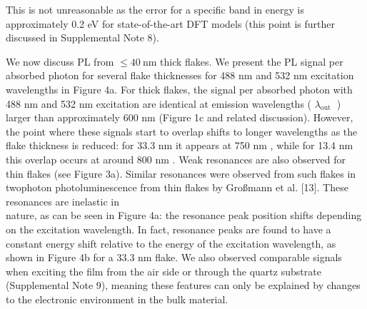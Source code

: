 \documentclass[10pt]{article}
\begin{document}
This is not unreasonable as the error for a specific band in energy is approximately 0.2 eV for state-of-the-art DFT models (this point is further discussed in Supplemental Note 8).

We now discuss PL from $\leq 40 \mathrm{~nm}$ thick flakes. We present the PL signal per absorbed photon for several flake thicknesses for 488 nm and 532 nm excitation wavelengths in Figure 4a. For thick flakes, the signal per absorbed photon with 488 nm and 532 nm excitation are identical at emission wavelengths ( $\lambda_{\text {out }}$ ) larger than approximately 600 nm (Figure 1c and related discussion). However, the point where these signals start to overlap shifts to longer wavelengths as the flake thickness is reduced: for 33.3 nm it appears at 750 nm , while for 13.4 nm this overlap occurs at around 800 nm . Weak resonances are also observed for thin flakes (see Figure 3a). Similar resonances were observed from such flakes in twophoton photoluminescence from thin flakes by Großmann et al. [13]. These resonances are inelastic in\\
nature, as can be seen in Figure 4a: the resonance peak position shifts depending on the excitation wavelength. In fact, resonance peaks are found to have a constant energy shift relative to the energy of the excitation wavelength, as shown in Figure 4b for a 33.3 nm flake. We also observed comparable signals when exciting the film from the air side or through the quartz substrate (Supplemental Note 9), meaning these features can only be explained by changes to the electronic environment in the bulk material.
\end{document}
